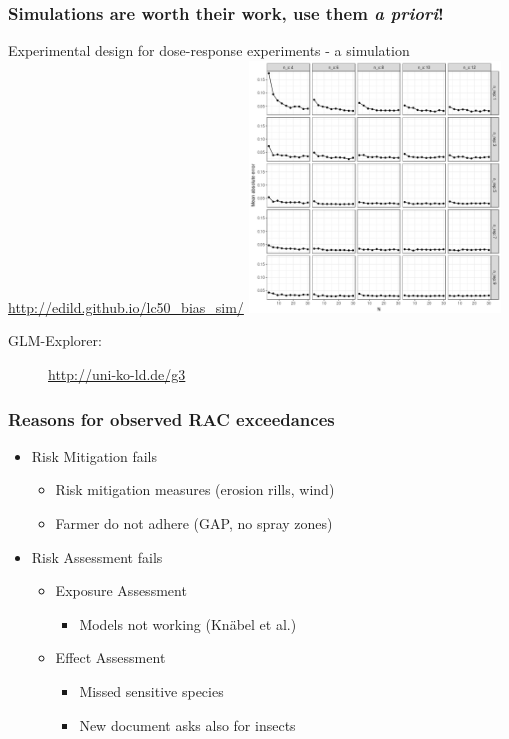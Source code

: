\documentclass[
	10pt
	]{beamer}
\begin{document}
\begin{frame}
\frametitle{Simulations are worth their work, use them \emph{a priori}!}
	Experimental design for dose-response experiments - a simulation \\
	\url{http://edild.github.io/lc50_bias_sim/}
		    	\includegraphics[width=0.5\textwidth, keepaspectratio]{figs/sim_drm.png} \\
	\begin{description}
		\item[GLM-Explorer:]{\url{http://uni-ko-ld.de/g3}}
	\end{description}
\end{frame}



\begin{frame}
\frametitle{Reasons for observed RAC exceedances}
	\begin{itemize}
		\item Risk Mitigation fails
			\begin{itemize}
				\item Risk mitigation measures (erosion rills, wind)
				\item Farmer do not adhere (GAP, no spray zones)
			\end{itemize}
		\item Risk Assessment fails
			\begin{itemize}
				\item Exposure Assessment
					\begin{itemize}
						\item Models not working (Knäbel et al.)
					\end{itemize}
				\item Effect Assessment
					\begin{itemize}
						\item Missed sensitive species
						\item New document asks also for insects
					\end{itemize}
			\end{itemize}

	\end{itemize}
\end{frame}
\end{document}
